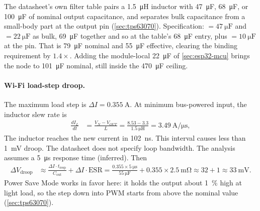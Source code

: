The datasheet's own filter table pairs a \SI{1.5}{\micro\henry} inductor with
\SI{47}{\micro\farad}, \SI{68}{\micro\farad}, or \SI{100}{\micro\farad} of
nominal output capacitance, and separates bulk capacitance from a small-body
part at the output pin (\cref{sec:tps63070}). Specification:
 $= \SI{47}{\micro\farad}$ and  $= \SI{22}{\micro\farad}$ as bulk,
\SI{69}{\micro\farad} together and so at the table's \SI{68}{\micro\farad}
entry, plus  $= \SI{10}{\micro\farad}$ at the pin.
That is \SI{79}{\micro\farad} nominal and \SI{55}{\micro\farad} effective,
clearing the binding requirement by $1.4\times$. Adding the module-local
\SI{22}{\micro\farad} of \cref{sec:esp32-mcu} brings the node to
\SI{101}{\micro\farad} nominal, still inside the \SI{470}{\micro\farad}
ceiling.

\paragraph{Wi-Fi load-step droop.} The maximum load step is
$\Delta I = \SI{0.355}{\ampere}$. At minimum bus-powered input, the inductor
slew rate is
\begin{align*}
  \frac{dI_L}{dt} &= \frac{V_N - V_{OUT}}{L}
    = \frac{8.53-3.3}{\SI{1.5}{\micro\henry}} = \SI{3.49}{\ampere\per\micro\second},
\end{align*}
The inductor reaches the new current in \SI{102}{\nano\second}. This interval
causes less than \SI{1}{\milli\volt} droop. The datasheet does not specify loop
bandwidth. The analysis assumes a \SI{5}{\micro\second} response time
(inferred). Then
\begin{align*}
  \Delta V_{\mathrm{droop}} &\approx
    \frac{\Delta I \cdot t_{\mathrm{resp}}}{C_{\mathrm{out}}} + \Delta I \cdot \mathrm{ESR}
    = \frac{0.355 \times \SI{5}{\micro\second}}{\SI{55}{\micro\farad}}
      + 0.355\times\SI{2.5}{\milli\ohm}
    \approx 32 + 1 \approx \SI{33}{\milli\volt}.
\end{align*}
Power Save Mode works in favor here: it holds the output about
\SI{1}{\percent} high at light load, so the step down into PWM starts from above
the nominal value (\cref{sec:tps63070}).

